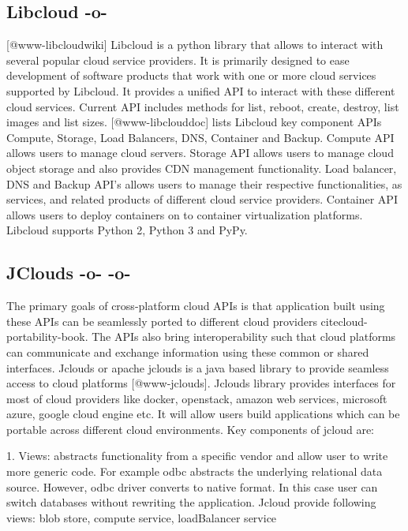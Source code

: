      
\subsection{Libcloud -o-}

[@www-libcloudwiki] Libcloud is a python library that allows to
interact with several popular cloud service providers. It is primarily
designed to ease development of software products that work with one
or more cloud services supported by Libcloud. It provides a unified
API to interact with these different cloud services. Current API
includes methods for list, reboot, create, destroy, list images and
list sizes. [@www-libclouddoc] lists Libcloud key component APIs
Compute, Storage, Load Balancers, DNS, Container and Backup. Compute
API allows users to manage cloud servers. Storage API allows users to
manage cloud object storage and also provides CDN management
functionality. Load balancer, DNS and Backup API's allows users to
manage their respective functionalities, as services, and related
products of different cloud service providers. Container API allows
users to deploy containers on to container virtualization
platforms. Libcloud supports Python 2, Python 3 and PyPy.


     
\subsection{JClouds -o- -o-}

The primary goals of cross-platform cloud APIs is that application
built using these APIs can be seamlessly ported to different cloud
providers cite{cloud-portability-book}.  The APIs also bring
interoperability such that cloud platforms can communicate and
exchange information using these common or shared interfaces.  Jclouds
or apache jclouds is a java based library to provide seamless access
to cloud platforms [@www-jclouds].  Jclouds library provides
interfaces for most of cloud providers like docker, openstack, amazon
web services, microsoft azure, google cloud engine etc. It will allow
users build applications which can be portable across different cloud
environments.  Key components of jcloud are:

     1. Views: abstracts functionality from a specific vendor and
        allow user to write more generic code. For example odbc
        abstracts the underlying relational data source. However, odbc
        driver converts to native format. In this case user can switch
        databases without rewriting the application. Jcloud provide
        following views: blob store, compute service, loadBalancer
        service

